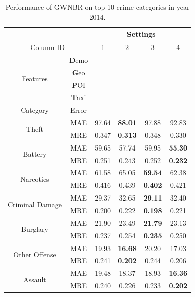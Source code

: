 \begin{table}[th]
	\centering
	\caption{Performance of GWNBR on top-10 crime categories in year 2014.}
	\label{tb:categoperf}
	\begin{tabular}{|c|c|c|c|c|c|}
		\hline
		\multicolumn{2}{|c|}{} & \multicolumn{4}{|c|}{Settings} \\ \hline
		\multicolumn{2}{|c|}{Column ID} & 1 & 2 & 3 & 4 \\ \hline
		\multirow{4}{*}{Features}	& \textbf{D}emo & \checkmark& \checkmark& \checkmark& \checkmark \\ \cline{2-6}
		& \textbf{G}eo & \checkmark & \checkmark& \checkmark& \checkmark \\ \cline{2-6}
		& \textbf{P}OI & &\checkmark & & \checkmark \\ \cline{2-6}
		& \textbf{T}axi & & & \checkmark& \checkmark \\ \hline
		Category& Error & \multicolumn{4}{|c|}{} \\ \hline
		\multirow{2}{*}{Theft} & MAE  &  97.64 & \textbf{88.01} & 97.88 & 92.83\\ \cline{2-6}
		& MRE & 0.347 & \textbf{0.313} & 0.348  & 0.330 \\\hline
		\multirow{2}{*}{Battery} & MAE & 59.65 & 57.74 & 59.95 & \textbf{55.30}\\ \cline{2-6}
		& MRE & 0.251 & 0.243 & 0.252 & \textbf{0.232}\\\hline
		\multirow{2}{*}{Narcotics} & MAE &61.58 & 65.05 & \textbf{59.54} & 62.38\\ \cline{2-6}
		& MRE & 0.416 & 0.439 & \textbf{0.402} & 0.421\\ \hline
		\multirow{2}{*}{Criminal Damage} & MAE & 29.37 & 32.65 & \textbf{29.11} & 32.40\\ \cline{2-6}
		& MRE & 0.200 & 0.222 & \textbf{0.198} & 0.221\\\hline
		\multirow{2}{*}{Burglary} & MAE & 21.90 & 23.49 & \textbf{21.79} & 23.13\\ \cline{2-6}
		& MRE & 0.237 & 0.254 & \textbf{0.235} & 0.250\\\hline
		\multirow{2}{*}{Other Offense} & MAE & 19.93 & \textbf{16.68} & 20.20 & 17.03\\ \cline{2-6}
		& MRE & 0.241 & \textbf{0.202} & 0.244 & 0.206\\\hline
		\multirow{2}{*}{Assault} & MAE & 19.48 & 18.37 & 18.93 & \textbf{16.36} \\ \cline{2-6}
		& MRE & 0.240 & 0.226 & 0.233 & \textbf{0.202} \\\hline

\end{tabular}
\end{table}
